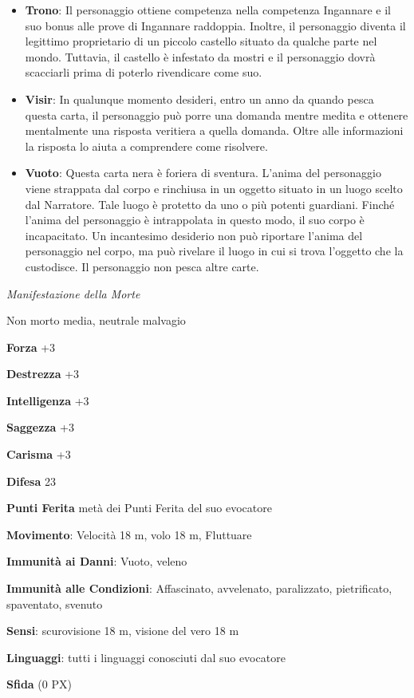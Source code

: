\begin{multicols}{2}
\begin{itemize}[leftmargin=*]
\item \textbf{Trono}: Il personaggio ottiene competenza nella competenza Ingannare e il suo bonus alle prove di Ingannare raddoppia. Inoltre, il personaggio diventa il legittimo proprietario di un piccolo castello situato da qualche parte nel mondo. Tuttavia, il castello è infestato da mostri e il personaggio dovrà scacciarli prima di poterlo rivendicare come suo.
\item \textbf{Visir}: In qualunque momento desideri, entro un anno da quando pesca questa carta, il personaggio può porre una domanda mentre medita e ottenere mentalmente una risposta veritiera a quella domanda. Oltre alle informazioni la risposta lo aiuta a comprendere come risolvere.
\item \textbf{Vuoto}: Questa carta nera è foriera di sventura. L'anima del personaggio viene strappata dal corpo e rinchiusa in un oggetto situato in un luogo scelto dal Narratore. Tale luogo è protetto da uno o più potenti guardiani. Finché l’anima del personaggio è intrappolata in questo modo, il suo corpo è incapacitato. Un incantesimo desiderio non può riportare l’anima del personaggio nel corpo, ma può rivelare il luogo in cui si trova l’oggetto che la custodisce. Il personaggio non pesca altre carte.
\end{itemize}


\emph{Manifestazione della Morte}

Non morto media, neutrale malvagio

\textbf{Forza} +3

\textbf{Destrezza} +3

\textbf{Intelligenza} +3

\textbf{Saggezza} +3

\textbf{Carisma} +3

\textbf{Difesa} 23

\textbf{Punti Ferita} metà dei Punti Ferita del suo evocatore

\textbf{Movimento}: Velocità 18 m, volo 18 m, Fluttuare

\textbf{Immunità ai Danni}: Vuoto, veleno

\textbf{Immunità alle Condizioni}: Affascinato, avvelenato, paralizzato, pietrificato, spaventato, svenuto

\textbf{Sensi}: scurovisione 18 m, visione del vero 18 m

\textbf{Linguaggi}: tutti i linguaggi conosciuti dal suo evocatore

\textbf{Sfida} (0 PX)


\end{multicols}
